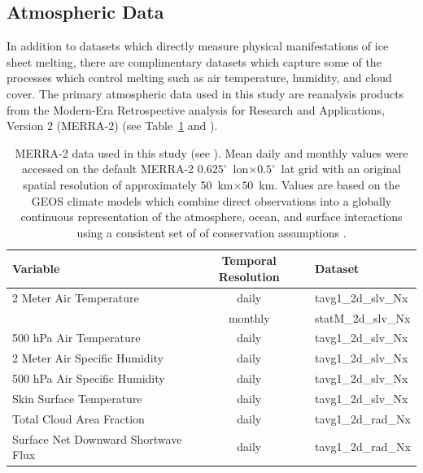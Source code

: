 \documentclass[11pt]{report}
\begin{document}
 \subsection{Atmospheric Data}
 
 
In addition to datasets which directly measure physical manifestations of ice sheet melting, there are complimentary datasets which capture some of the processes which control melting such as air temperature, humidity, and cloud cover. The primary atmospheric data used in this study are reanalysis products from the Modern-Era Retrospective analysis for Research and Applications, Version 2 (MERRA-2) (see Table~\ref{tab:merradata} and ). 

\begin{table}[!h]
\begin{center}
\begin{tabular}{ |l|c|l| } 
\hline
\bfseries{Variable} & \bfseries{Temporal Resolution} & \bfseries{Dataset}\\
\hline
2 Meter Air Temperature 			& daily 	&  tavg1\_2d\_slv\_Nx\\ 
									& monthly 	&  statM\_2d\_slv\_Nx\\
500 hPa Air Temperature 			& daily 	&  tavg1\_2d\_slv\_Nx\\ 
2 Meter Air Specific Humidity 		& daily 	& tavg1\_2d\_slv\_Nx \\ 
500 hPa Air Specific Humidity 		& daily 	& tavg1\_2d\_slv\_Nx \\ 
Skin Surface Temperature 			& daily 	& tavg1\_2d\_slv\_Nx \\ 
Total Cloud	Area Fraction			& daily 	& tavg1\_2d\_rad\_Nx \\
Surface Net Downward Shortwave Flux & daily 	& tavg1\_2d\_rad\_Nx \\
\hline
\end{tabular}
\caption[MERRA-2 Data]{MERRA-2 data used in this study (see ). Mean daily and monthly values were accessed on the default MERRA-2 $0.625^{\circ}$~lon$\times0.5^{\circ}$~lat grid with an original spatial resolution of approximately $50$~km$\times50$~km\cite[][]{bosilovich2016}. Values are based on the GEOS climate models which combine direct observations into a globally continuous representation of the atmosphere, ocean, and surface interactions using a consistent set of of conservation assumptions \cite[][]{gelaro2017,bosilovich2016}. \label{tab:merradata}}
\end{center}
\end{table}
\end{document}
